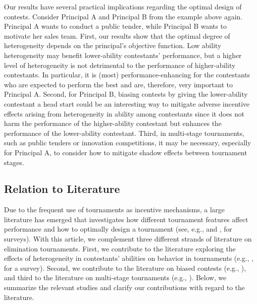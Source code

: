 \documentclass[11pt,a4paper]{article}
\begin{document}
Our results have several practical implications regarding the optimal design of contests. Consider Principal A and Principal B from the example above again. Principal A wants to conduct a public tender, while Principal B wants to motivate her sales team. First, our results show that the optimal degree of heterogeneity depends on the principal's objective function. Low ability heterogeneity may benefit lower-ability contestants' performance, but a higher level of heterogeneity is not detrimental to the performance of higher-ability contestants. In particular, it is (most) performance-enhancing for the contestants who are expected to perform the best and are, therefore, very important to Principal A. Second, for Principal B, biasing contests by giving the lower-ability contestant a head start could be an interesting way to mitigate adverse incentive effects arising from heterogeneity in ability among contestants since it does not harm the performance of the higher-ability contestant but enhances the performance of the lower-ability contestant. Third, in multi-stage tournaments, such as public tenders or innovation competitions, it may be necessary, especially for Principal A, to consider how to mitigate shadow effects between tournament stages.\par

\subsection{Relation to Literature}

Due to the frequent use of tournaments as incentive mechanisms, a large literature has emerged that investigates how different tournament features affect performance and how to optimally design a tournament (see, e.g.,  and , for surveys). 
With this article, we complement three different strands of literature on elimination tournaments.
First, we contribute to the literature exploring the effects of heterogeneity in contestants' abilities on behavior in tournaments (e.g., , for a survey). Second, we contribute to the literature on biased contests (e.g., ), and third to the literature on multi-stage tournaments (e.g., ). Below, we summarize the relevant studies and clarify our contributions with regard to the literature. \par
\end{document}
